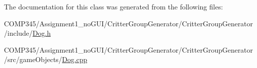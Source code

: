 The documentation for this class was generated from the following files\+:\begin{DoxyCompactItemize}
\item 
C\+O\+M\+P345/\+Assignment1\+\_\+no\+G\+U\+I/\+Critter\+Group\+Generator/\+Critter\+Group\+Generator/include/\hyperlink{_dog_8h}{Dog.\+h}\item 
C\+O\+M\+P345/\+Assignment1\+\_\+no\+G\+U\+I/\+Critter\+Group\+Generator/\+Critter\+Group\+Generator/src/game\+Objects/\hyperlink{_dog_8cpp}{Dog.\+cpp}\end{DoxyCompactItemize}
